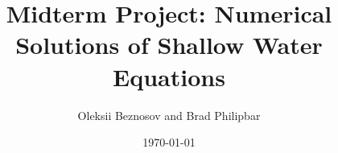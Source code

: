 \documentclass{article}
\title{Midterm Project: Numerical Solutions of Shallow Water Equations}
\author{Oleksii Beznosov and Brad Philipbar}
\date{\today}
\begin{document}
\maketitle
\begin{flushleft}
\newpage









\end{flushleft}
\end{document}
